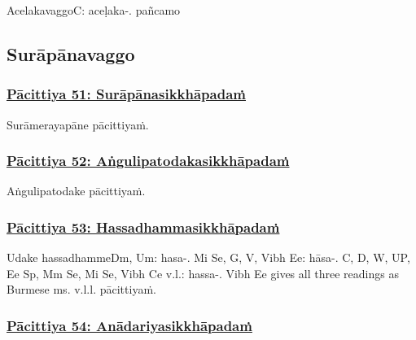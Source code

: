 \begin{center}
	Acelakavaggo\makeatletter\hyperlink{endnote-appendix}\makeatother C: aceḷaka-. pañcamo
\end{center}



\subsection{Surāpānavaggo}

\subsubsection*{\hyperref[exp51]{Pācittiya 51: Surāpānasikkhāpadaṁ}}
\label{pac51}

Surāmerayapāne pācittiyaṁ.



\subsubsection*{\hyperref[exp52]{Pācittiya 52: Aṅgulipatodakasikkhāpadaṁ}}
\label{pac52}

Aṅgulipatodake pācittiyaṁ.



\subsubsection*{\hyperref[exp53]{Pācittiya 53: Hassadhammasikkhāpadaṁ}}
\label{pac53}

Udake hassadhamme\makeatletter\hyperlink{endnote-appendix}\makeatother Dm, Um: hasa-. Mi Se, G, V, Vibh Ee: hāsa-. C, D, W, UP, Ee Sp, Mm Se, Mi Se, Vibh Ce v.l.: hassa-. Vibh Ee gives all three
readings as Burmese ms. v.l.l. pācittiyaṁ.



\subsubsection*{\hyperref[exp54]{Pācittiya 54: Anādariyasikkhāpadaṁ}}
\label{pac54}


